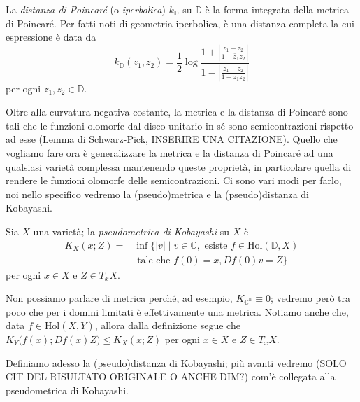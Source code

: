 \begin{defn}
    La \textit{distanza di Poincaré} (o \textit{iperbolica}) $k_{\mathbb{D}}$ su $\mathbb{D}$ è la forma integrata della metrica di Poincaré. Per fatti noti di geometria iperbolica, è una distanza completa la cui espressione è data da
    \begin{equation}
        k_{\mathbb{D}}(z_1,z_2)=\frac{1}{2}\log{\frac{1+\left|\frac{z_1-z_2}{1-\bar{z}_1z_2}\right|}{1-\left|\frac{z_1-z_2}{1-\bar{z}_1z_2}\right|}}
    \end{equation}
    per ogni $z_1,z_2 \in \mathbb{D}$.
\end{defn}

Oltre alla curvatura negativa costante, la metrica e la distanza di Poincaré sono tali che le funzioni olomorfe dal disco unitario in sé sono semicontrazioni rispetto ad esse (Lemma di Schwarz-Pick, INSERIRE UNA CITAZIONE). Quello che vogliamo fare ora è generalizzare la metrica e la distanza di Poincaré ad una qualsiasi varietà complessa mantenendo queste proprietà, in particolare quella di rendere le funzioni olomorfe delle semicontrazioni. Ci sono vari modi per farlo, noi nello specifico vedremo la (pseudo)metrica e la (pseudo)distanza di Kobayashi.

\begin{defn}
    Sia $X$ una varietà; la \textit{pseudometrica di Kobayashi} su $X$ è
    \begin{equation}\begin{split}
        K_X(x;Z)=&\inf\{|v| \mid v \in \mathbb{C}, \text{ esiste }f \in \text{Hol}(\mathbb{D},X) \\
        &\text{ tale che } f(0)=x, Df(0)v=Z\}
    \end{split}\end{equation}
    per ogni $x \in X$ e $Z \in T_xX$.
\end{defn}

\begin{oss}
    Non possiamo parlare di metrica perché, ad esempio, $K_{\mathbb{C}^n}\equiv 0$; vedremo però tra poco che per i domini limitati è effettivamente una metrica. Notiamo anche che, data $f \in \text{Hol}(X,Y)$, allora dalla definizione segue che $K_Y\big(f(x);Df(x)Z\big) \le K_X(x;Z)$ per ogni $x \in X$ e $Z \in T_xX$.
\end{oss}

Definiamo adesso la (pseudo)distanza di Kobayashi; più avanti vedremo (SOLO CIT DEL RISULTATO ORIGINALE O ANCHE DIM?) com'è collegata alla pseudometrica di Kobayashi.

